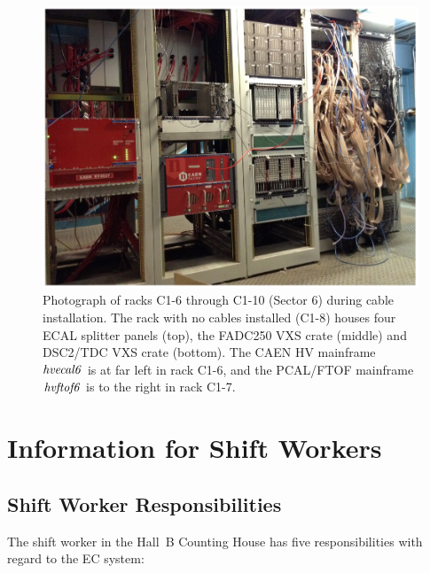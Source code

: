 \documentclass[letterpaper,10pt]{article}
\begin{document}
\begin{figure}[htbp]
  \centering
  \includegraphics[width= 5in, keepaspectratio = true]{Sector6-electronics}
  \vspace{2mm}
  \caption{Photograph of racks C1-6 through C1-10 (Sector 6) during cable installation.  The rack with
    no cables installed (C1-8) houses four ECAL splitter panels (top), the FADC250 VXS crate (middle)
    and DSC2/TDC VXS crate (bottom).  The CAEN HV mainframe $\it{hvecal6}$ is at far left in rack C1-6,
    and the PCAL/FTOF mainframe $\it{hvftof6}$ is to the right in rack C1-7.}
  \label{fc-layout-2} 
\end{figure}


\clearpage

\vfil
\eject


\section{Information for Shift Workers}

\subsection{Shift Worker Responsibilities}

The shift worker in the Hall~B Counting House has five responsibilities with regard to the EC
system:
\end{document}
